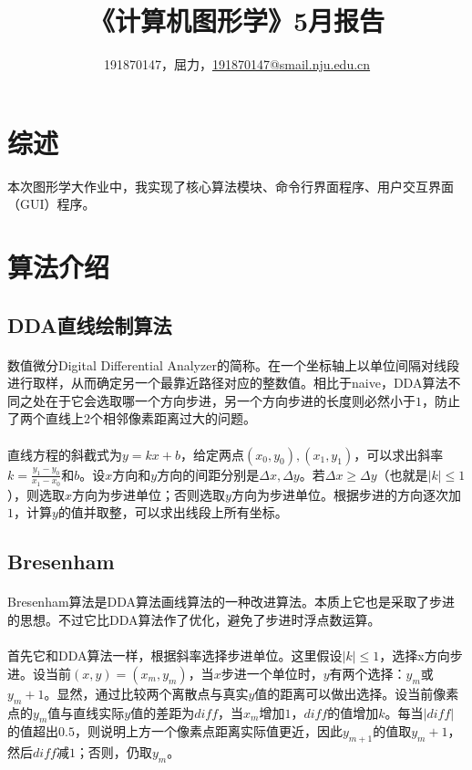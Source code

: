 \documentclass[a4paper,UTF8]{article}
\theoremstyle{definition}
\begin{document}
\title{\textbf{《计算机图形学》5月报告}}
\author{191870147，屈力，\href{mailto:xxx@xxx.com}{191870147@smail.nju.edu.cn}}
\maketitle

\section{综述}
本次图形学大作业中，我实现了核心算法模块、命令行界面程序、用户交互界面（GUI）程序。
\section{算法介绍}
\subsection{DDA直线绘制算法}
\paragraph{}数值微分Digital Differential Analyzer的简称。在一个坐标轴上以单位间隔对线段进行取样，从而确定另一个最靠近路径对应的整数值。相比于naive，DDA算法不同之处在于它会选取哪一个方向步进，另一个方向步进的长度则必然小于$1$，防止了两个直线上$2$个相邻像素距离过大的问题。
\paragraph{}直线方程的斜截式为$y=kx+b$，给定两点$(x_0,y_0),(x_1,y_1)$，可以求出斜率$k=\frac{y_1-y_0}{x_1-x_0}$和$b$。设$x$方向和$y$方向的间距分别是$\Delta x,\Delta y$。若$\Delta x\ge \Delta y$（也就是$|k|\le 1$），则选取$x$方向为步进单位；否则选取$y$方向为步进单位。根据步进的方向逐次加$1$，计算$y$的值并取整，可以求出线段上所有坐标。
\subsection{Bresenham}
\paragraph{}Bresenham算法是DDA算法画线算法的一种改进算法。本质上它也是采取了步进的思想。不过它比DDA算法作了优化，避免了步进时浮点数运算。
\paragraph{}首先它和DDA算法一样，根据斜率选择步进单位。这里假设$|k|\le 1$，选择x方向步进。设当前$(x,y)=(x_m,y_m)$，当$x$步进一个单位时，$y$有两个选择：$y_m$或$y_{m}+1$。显然，通过比较两个离散点与真实$y$值的距离可以做出选择。设当前像素点的$y_m$值与直线实际$y$值的差距为$diff$，当$x_m$增加$1$，$diff$的值增加$k$。每当$|diff|$的值超出$0.5$，则说明上方一个像素点距离实际值更近，因此$y_{m+1}$的值取$y_m+1$，然后$diff$减$1$；否则，仍取$y_m$。
\end{document}
